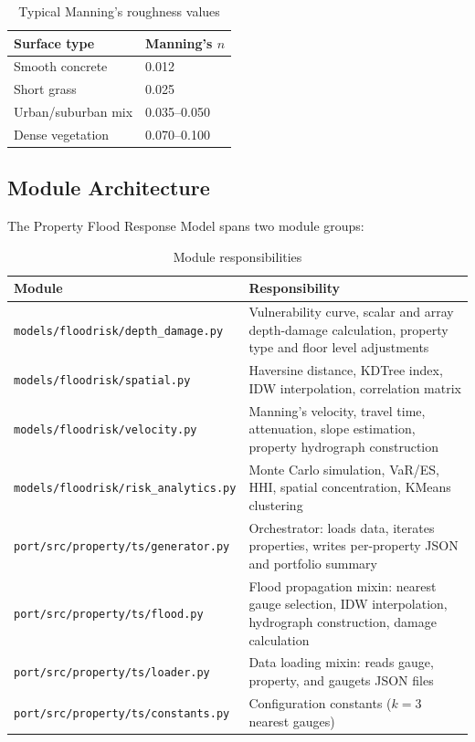 \documentclass[11pt,a4paper]{article}
\begin{document}
\begin{table}[H]
\centering
\begin{tabular}{ll}
    \toprule
    \textbf{Surface type} & \textbf{Manning's $n$} \\
    \midrule
    Smooth concrete        & 0.012 \\
    Short grass            & 0.025 \\
    Urban/suburban mix     & 0.035--0.050 \\
    Dense vegetation       & 0.070--0.100 \\
    \bottomrule
\end{tabular}
\caption{Typical Manning's roughness values}
\label{tab:manning_n}
\end{table}

\mkmimplementation

\subsection{Module Architecture}

The Property Flood Response Model spans two module groups:

\begin{table}[H]
\centering
\begin{tabular}{lp{9cm}}
    \toprule
    \textbf{Module} & \textbf{Responsibility} \\
    \midrule
    \texttt{models/floodrisk/depth\_damage.py} & Vulnerability curve, scalar and
        array depth-damage calculation, property type and floor level adjustments \\
    \texttt{models/floodrisk/spatial.py} & Haversine distance, KDTree index, IDW
        interpolation, correlation matrix \\
    \texttt{models/floodrisk/velocity.py} & Manning's velocity, travel time,
        attenuation, slope estimation, property hydrograph construction \\
    \texttt{models/floodrisk/risk\_analytics.py} & Monte Carlo simulation, VaR/ES,
        HHI, spatial concentration, KMeans clustering \\
    \midrule
    \texttt{port/src/property/ts/generator.py} & Orchestrator: loads data, iterates
        properties, writes per-property JSON and portfolio summary \\
    \texttt{port/src/property/ts/flood.py} & Flood propagation mixin: nearest gauge
        selection, IDW interpolation, hydrograph construction, damage calculation \\
    \texttt{port/src/property/ts/loader.py} & Data loading mixin: reads gauge,
        property, and gaugets JSON files \\
    \texttt{port/src/property/ts/constants.py} & Configuration constants
        ($k = 3$ nearest gauges) \\
    \bottomrule
\end{tabular}
\caption{Module responsibilities}
\label{tab:modules}
\end{table}
\end{document}
